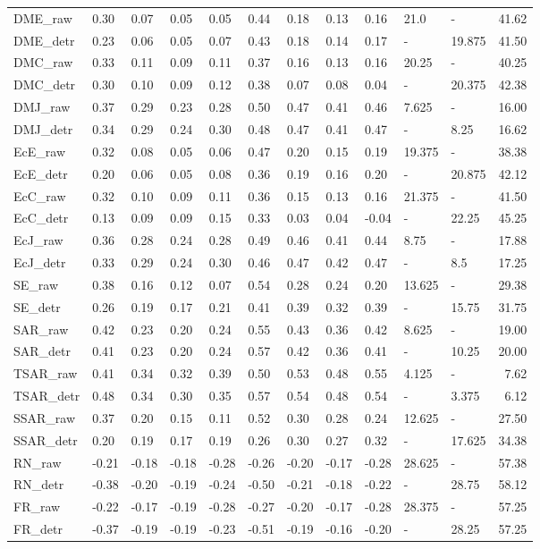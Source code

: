 \begin{tabular}{lllllllllllr}
\midrule
DME\_raw & 0.30 & 0.07 & 0.05 & 0.05 & 0.44 & 0.18 & 0.13 & 0.16 & 21.0 & - & 41.62 \\
DME\_detr & 0.23 & 0.06 & 0.05 & 0.07 & 0.43 & 0.18 & 0.14 & 0.17 & - & 19.875 & 41.50 \\
\midrule
DMC\_raw & 0.33 & 0.11 & 0.09 & 0.11 & 0.37 & 0.16 & 0.13 & 0.16 & 20.25 & - & 40.25 \\
DMC\_detr & 0.30 & 0.10 & 0.09 & 0.12 & 0.38 & 0.07 & 0.08 & 0.04 & - & 20.375 & 42.38 \\
\midrule
DMJ\_raw & 0.37 & 0.29 & 0.23 & 0.28 & 0.50 & 0.47 & 0.41 & 0.46 & 7.625 & - & 16.00 \\
DMJ\_detr & 0.34 & 0.29 & 0.24 & 0.30 & 0.48 & 0.47 & 0.41 & 0.47 & - & 8.25 & 16.62 \\
\midrule
EcE\_raw & 0.32 & 0.08 & 0.05 & 0.06 & 0.47 & 0.20 & 0.15 & 0.19 & 19.375 & - & 38.38 \\
EcE\_detr & 0.20 & 0.06 & 0.05 & 0.08 & 0.36 & 0.19 & 0.16 & 0.20 & - & 20.875 & 42.12 \\
\midrule
EcC\_raw & 0.32 & 0.10 & 0.09 & 0.11 & 0.36 & 0.15 & 0.13 & 0.16 & 21.375 & - & 41.50 \\
EcC\_detr & 0.13 & 0.09 & 0.09 & 0.15 & 0.33 & 0.03 & 0.04 & -0.04 & - & 22.25 & 45.25 \\
\midrule
EcJ\_raw & 0.36 & 0.28 & 0.24 & 0.28 & 0.49 & 0.46 & 0.41 & 0.44 & 8.75 & - & 17.88 \\
EcJ\_detr & 0.33 & 0.29 & 0.24 & 0.30 & 0.46 & 0.47 & 0.42 & 0.47 & - & 8.5 & 17.25 \\
\midrule
SE\_raw & 0.38 & 0.16 & 0.12 & 0.07 & 0.54 & 0.28 & 0.24 & 0.20 & 13.625 & - & 29.38 \\
SE\_detr & 0.26 & 0.19 & 0.17 & 0.21 & 0.41 & 0.39 & 0.32 & 0.39 & - & 15.75 & 31.75 \\
\midrule
SAR\_raw & 0.42 & 0.23 & 0.20 & 0.24 & 0.55 & 0.43 & 0.36 & 0.42 & 8.625 & - & 19.00 \\
SAR\_detr & 0.41 & 0.23 & 0.20 & 0.24 & 0.57 & 0.42 & 0.36 & 0.41 & - & 10.25 & 20.00 \\
\midrule
TSAR\_raw & 0.41 & 0.34 & 0.32 & 0.39 & 0.50 & 0.53 & 0.48 & 0.55 & 4.125 & - & 7.62 \\
TSAR\_detr & 0.48 & 0.34 & 0.30 & 0.35 & 0.57 & 0.54 & 0.48 & 0.54 & - & 3.375 & 6.12 \\
\midrule
SSAR\_raw & 0.37 & 0.20 & 0.15 & 0.11 & 0.52 & 0.30 & 0.28 & 0.24 & 12.625 & - & 27.50 \\
SSAR\_detr & 0.20 & 0.19 & 0.17 & 0.19 & 0.26 & 0.30 & 0.27 & 0.32 & - & 17.625 & 34.38 \\
\midrule
RN\_raw & -0.21 & -0.18 & -0.18 & -0.28 & -0.26 & -0.20 & -0.17 & -0.28 & 28.625 & - & 57.38 \\
RN\_detr & -0.38 & -0.20 & -0.19 & -0.24 & -0.50 & -0.21 & -0.18 & -0.22 & - & 28.75 & 58.12 \\
\midrule
FR\_raw & -0.22 & -0.17 & -0.19 & -0.28 & -0.27 & -0.20 & -0.17 & -0.28 & 28.375 & - & 57.25 \\
FR\_detr & -0.37 & -0.19 & -0.19 & -0.23 & -0.51 & -0.19 & -0.16 & -0.20 & - & 28.25 & 57.25 \\
\midrule
\bottomrule
\end{tabular}
\midrule
